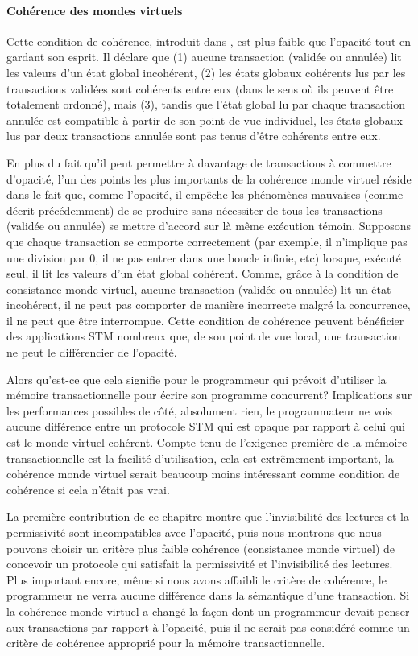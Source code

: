 \paragraph{Cohérence des mondes virtuels}
Cette condition de cohérence, introduit dans \cite{IR09}, est plus faible que l'opacité tout en gardant son esprit.
Il déclare que (1) aucune transaction (validée ou annulée) lit les valeurs d'un état global incohérent,
(2) les états globaux cohérents lus par les transactions validées sont cohérents entre eux (dans le sens où ils peuvent être totalement ordonné),
mais (3), tandis que l'état global lu par chaque transaction annulée est compatible à partir de son point de vue individuel,
les états globaux lus par deux transactions annulée sont pas tenus d'être cohérents entre eux.

En plus du fait qu'il peut permettre à davantage de transactions à commettre d'opacité,
l'un des points les plus importants de la cohérence monde virtuel réside dans le fait que, comme l'opacité,
il empêche les phénomènes mauvaises (comme décrit précédemment) de se produire sans nécessiter de tous les transactions
(validée ou annulée) se mettre d'accord sur là même exécution témoin.
Supposons que chaque transaction se comporte correctement (par exemple, il n'implique pas une division par 0,
il ne pas entrer dans une boucle infinie, etc) lorsque, exécuté seul, il lit les valeurs d'un état global cohérent.
Comme, grâce à la condition de consistance monde virtuel, aucune transaction (validée ou annulée) lit un état incohérent,
il ne peut pas comporter de manière incorrecte malgré la concurrence, il ne peut que être interrompue.
Cette condition de cohérence peuvent bénéficier des applications STM nombreux que, de son point de vue local,
une transaction ne peut le différencier de l'opacité.




Alors qu'est-ce que cela signifie pour le programmeur qui prévoit d'utiliser la mémoire transactionnelle pour écrire son programme concurrent?
Implications sur les performances possibles de côté, absolument rien, le programmateur
ne vois aucune différence entre un protocole STM qui est opaque par rapport à celui qui est le monde virtuel cohérent.
Compte tenu de l'exigence première de la mémoire transactionnelle est la facilité d'utilisation, cela est extrêmement important,
la cohérence monde virtuel serait beaucoup moins intéressant comme condition de cohérence si cela n'était pas vrai.

La première contribution de ce chapitre montre que l'invisibilité des lectures et la permissivité sont incompatibles avec l'opacité,
puis nous montrons que nous pouvons choisir un critère plus faible cohérence (consistance monde virtuel) de concevoir un protocole qui satisfait la permissivité et l'invisibilité des lectures.
Plus important encore, même si nous avons affaibli le critère de cohérence, le programmeur ne verra aucune différence dans la sémantique d'une transaction.
Si la cohérence monde virtuel a changé la façon dont un programmeur devait penser aux transactions par rapport à l'opacité,
puis il ne serait pas considéré comme un critère de cohérence approprié pour la mémoire transactionnelle.


